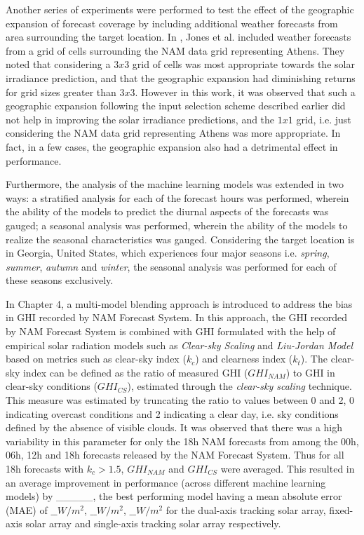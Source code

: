 \par Another series of experiments were performed to test the effect of the geographic expansion of forecast coverage by including additional weather forecasts from area surrounding the target location. In \cite{thesis_zach}, Jones et al. included weather forecasts from a grid of cells surrounding the NAM data grid representing Athens. They noted that considering a $3 x 3$ grid of cells was most appropriate towards the solar irradiance prediction, and that the geographic expansion had diminishing returns for grid sizes greater than $3 x 3$. However in this work, it was observed that such a geographic expansion following the input selection scheme described earlier did not help in improving the solar irradiance predictions, and the $1 x 1$ grid, i.e. just considering the NAM data grid representing Athens was more appropriate. In fact, in a few cases, the geographic expansion also had a detrimental effect in performance.

\par Furthermore, the analysis of the machine learning models was extended in two ways: a stratified analysis for each of the forecast hours was performed, wherein the ability of the models to predict the diurnal aspects of the forecasts was gauged; a seasonal analysis was performed, wherein the ability of the models to realize the seasonal characteristics was gauged. Considering the target location is in Georgia, United States, which experiences four major seasons i.e. \textit{spring}, \textit{summer}, \textit{autumn} and \textit{winter}, the seasonal analysis was performed for each of these seasons exclusively. 

\par In Chapter 4, a multi-model blending approach is introduced to address the bias in GHI recorded by NAM Forecast System. In this approach, the GHI recorded by NAM Forecast System is combined with GHI formulated with the help of empirical solar radiation models such as \textit{Clear-sky Scaling} and \textit{Liu-Jordan Model} based on metrics such as clear-sky index ($k_c$) and clearness index ($k_t$). The clear-sky index can be defined as the ratio of measured GHI ($GHI_{NAM}$) to GHI in clear-sky conditions ($GHI_{CS}$), estimated through the \textit{clear-sky scaling} technique. This measure was estimated by truncating the ratio to values between 0 and 2, 0 indicating overcast conditions and 2 indicating a clear day, i.e. sky conditions defined by the absence of visible clouds. It was observed that there was a high variability in this parameter for only the 18h NAM forecasts from among the 00h, 06h, 12h and 18h forecasts released by the NAM Forecast System. Thus for all 18h forecasts with $k_c > 1.5$, $GHI_{NAM}$ and $GHI_{CS}$ were averaged. This resulted in an average improvement in performance (across different machine learning models) by \_\_\_\_\_, the best performing model having a mean absolute error (MAE) of $\_\_ W/m^2$, $\_\_ W/m^2$, $\_\_ W/m^2$ for the dual-axis tracking solar array, fixed-axis solar array and single-axis tracking solar array respectively.

